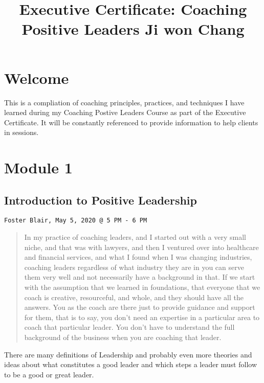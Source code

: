 \documentclass[]{book}
\title{Executive Certificate: Coaching Positive Leaders Ji won Chang}
\author{}
\date{\vspace{-2.5em}}
\begin{document}
\maketitle

{
\setcounter{tocdepth}{1}
\tableofcontents
}
\hypertarget{welcome}{%
\chapter{Welcome}\label{welcome}}

This is a compliation of coaching principles, practices, and techniques I have learned during my Coaching Postive Leaders Course as part of the Executive Certificate. It will be constantly referenced to provide information to help clients in sessions.

\hypertarget{module-1}{%
\chapter{Module 1}\label{module-1}}

\hypertarget{introduction-to-positive-leadership}{%
\section{Introduction to Positive Leadership}\label{introduction-to-positive-leadership}}

\texttt{Foster\ Blair,\ May\ 5,\ 2020\ @\ 5\ PM\ -\ 6\ PM}

\begin{quote}
In my practice of coaching leaders, and I started out with a very small niche, and that was with lawyers, and then I ventured over into healthcare and financial services, and what I found when I was changing industries, coaching leaders regardless of what industry they are in you can serve them very well and not necessarily have a background in that. If we start with the assumption that we learned in foundations, that everyone that we coach is creative, resourceful, and whole, and they should have all the answers. You as the coach are there just to provide guidance and support for them, that is to say, you don't need an expertise in a particular area to coach that particular leader. You don't have to understand the full background of the business when you are coaching that leader.
\end{quote}

There are many definitions of Leadership and probably even more theories and ideas about what constitutes a good leader and which steps a leader must follow to be a good or great leader.
\end{document}
